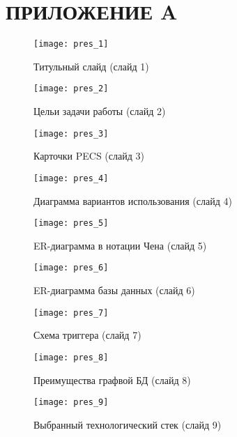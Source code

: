 \chapter*{ПРИЛОЖЕНИЕ A}


\begin{figure}[ht!]\centering
	\texttt{[image: pres\_1]}
	\caption{Титульный слайд (слайд 1)}
\end{figure}

\begin{figure}[ht!]\centering
	\texttt{[image: pres\_2]}
	\caption{Цельи задачи работы (слайд 2)}
\end{figure}

\begin{figure}[ht!]\centering
	\texttt{[image: pres\_3]}
	\caption{Карточки PECS (слайд 3)}
\end{figure}

\begin{figure}[ht!]\centering
	\texttt{[image: pres\_4]}
	\caption{Диаграмма вариантов использования (слайд 4)}
\end{figure}

\begin{figure}[ht!]\centering
	\texttt{[image: pres\_5]}
	\caption{ER-диаграмма в нотации Чена (слайд 5)}
\end{figure}

\begin{figure}[ht!]\centering
	\texttt{[image: pres\_6]}
	\caption{ER-диаграмма базы данных (слайд 6)}
\end{figure}

\begin{figure}[ht!]\centering
	\texttt{[image: pres\_7]}
	\caption{Схема триггера (слайд 7)}
\end{figure}

\begin{figure}[ht!]\centering
	\texttt{[image: pres\_8]}
	\caption{Преимущества графвой БД (слайд 8)}
\end{figure}

\begin{figure}[ht!]\centering
	\texttt{[image: pres\_9]}
	\caption{Выбранный технологический стек (слайд 9)}
\end{figure}

